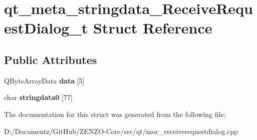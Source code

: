 \hypertarget{structqt__meta__stringdata___receive_request_dialog__t}{}\section{qt\+\_\+meta\+\_\+stringdata\+\_\+\+Receive\+Request\+Dialog\+\_\+t Struct Reference}
\label{structqt__meta__stringdata___receive_request_dialog__t}
\subsection*{Public Attributes}
\begin{DoxyCompactItemize}
\item 
\mbox{\label{structqt__meta__stringdata___receive_request_dialog__t_aaba35c7183ce7c4a888c43bb4662bc35}} 
Q\+Byte\+Array\+Data {\bfseries data} \mbox{[}5\mbox{]}
\item 
\mbox{\label{structqt__meta__stringdata___receive_request_dialog__t_aaaf14c8d3126668d27794db1982cc48c}} 
char {\bfseries stringdata0} \mbox{[}77\mbox{]}
\end{DoxyCompactItemize}


The documentation for this struct was generated from the following file\+:\begin{DoxyCompactItemize}
\item 
D\+:/\+Documentz/\+Git\+Hub/\+Z\+E\+N\+Z\+O-\/\+Core/src/qt/moc\+\_\+receiverequestdialog.\+cpp\end{DoxyCompactItemize}
